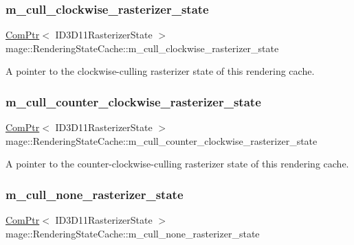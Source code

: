 \subsubsection{\texorpdfstring{m\+\_\+cull\+\_\+clockwise\+\_\+rasterizer\+\_\+state}{m\_cull\_clockwise\_rasterizer\_state}}
{\footnotesize\ttfamily \hyperlink{namespacemage_ae74f374780900893caa5555d1031fd79}{Com\+Ptr}$<$ I\+D3\+D11\+Rasterizer\+State $>$ mage\+::\+Rendering\+State\+Cache\+::m\+\_\+cull\+\_\+clockwise\+\_\+rasterizer\+\_\+state\hspace{0.3cm}{\ttfamily [private]}}

A pointer to the clockwise-\/culling rasterizer state of this rendering cache. \hypertarget{structmage_1_1_rendering_state_cache_a825b91a2cb5ab76375d1ebebe7a0ef74}{}\label{structmage_1_1_rendering_state_cache_a825b91a2cb5ab76375d1ebebe7a0ef74} 
\subsubsection{\texorpdfstring{m\+\_\+cull\+\_\+counter\+\_\+clockwise\+\_\+rasterizer\+\_\+state}{m\_cull\_counter\_clockwise\_rasterizer\_state}}
{\footnotesize\ttfamily \hyperlink{namespacemage_ae74f374780900893caa5555d1031fd79}{Com\+Ptr}$<$ I\+D3\+D11\+Rasterizer\+State $>$ mage\+::\+Rendering\+State\+Cache\+::m\+\_\+cull\+\_\+counter\+\_\+clockwise\+\_\+rasterizer\+\_\+state\hspace{0.3cm}{\ttfamily [private]}}

A pointer to the counter-\/clockwise-\/culling rasterizer state of this rendering cache. \hypertarget{structmage_1_1_rendering_state_cache_a3801dbdf6386c9534123d695cbde47c7}{}\label{structmage_1_1_rendering_state_cache_a3801dbdf6386c9534123d695cbde47c7} 
\subsubsection{\texorpdfstring{m\+\_\+cull\+\_\+none\+\_\+rasterizer\+\_\+state}{m\_cull\_none\_rasterizer\_state}}
{\footnotesize\ttfamily \hyperlink{namespacemage_ae74f374780900893caa5555d1031fd79}{Com\+Ptr}$<$ I\+D3\+D11\+Rasterizer\+State $>$ mage\+::\+Rendering\+State\+Cache\+::m\+\_\+cull\+\_\+none\+\_\+rasterizer\+\_\+state\hspace{0.3cm}{\ttfamily [private]}}

